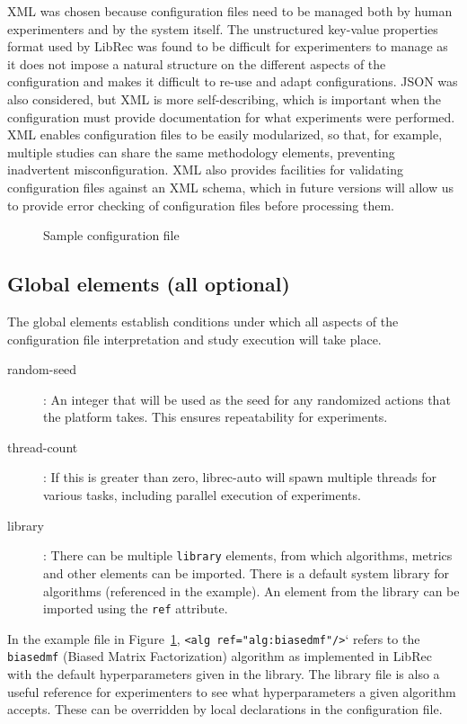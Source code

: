 XML was chosen because configuration files need to be managed both by human experimenters and by the system itself. The unstructured key-value properties format used by LibRec was found to be difficult for experimenters to manage as it does not impose a natural structure on the different aspects of the configuration and makes it difficult to re-use and adapt configurations. JSON was also considered, but XML is more self-describing, which is important when the configuration must provide documentation for what experiments were performed. XML enables configuration files to be easily modularized, so that, for example, multiple studies can share the same methodology elements, preventing inadvertent misconfiguration. XML also provides facilities for validating configuration files against an XML schema, which in future versions will allow us to provide error checking of configuration files before processing them.

\begin{figure}[ht!]
    \centering
    
    \caption{Sample configuration file}
    \label{fig:config}
    \vspace{-0.15in}
\end{figure}

\subsection{Global elements (all optional)}
\label{subsec:lib_auto_global_elements}
The global elements establish conditions under which all aspects of the configuration file interpretation and study execution will take place.

\begin{description}
\item[random-seed]: An integer that will be used as the seed for any randomized actions that the platform takes. This ensures repeatability for experiments.
\item[thread-count]: If this is greater than zero, librec-auto will spawn multiple threads for various tasks, including parallel execution of experiments.
\item[library]: There can be multiple \texttt{library} elements, from which algorithms, metrics and other elements can be imported. There is a default system library for algorithms (referenced in the example). An element from the library can be imported using the \texttt{ref} attribute.
\end{description}

In the example file in Figure~\ref{fig:config}, \texttt{<alg ref="alg:biasedmf"/>}` refers to the \texttt{biasedmf} (Biased Matrix Factorization) algorithm as implemented in LibRec with the default hyperparameters given in the library. The library file is also a useful reference for experimenters to see what hyperparameters a given algorithm accepts. These can be overridden by local declarations in the configuration file.

